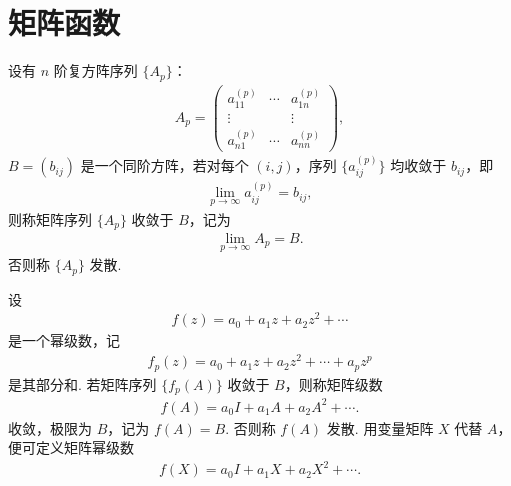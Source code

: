 \documentclass[../../main.tex]{subfiles}%
\begin{document}
\section{矩阵函数}

\begin{definition}[复方阵幂级数]
设有 $n$ 阶复方阵序列 $\{A_p\}$：
\begin{align*}
A_p = \begin{pmatrix}
a_{11}^{(p)} & \cdots & a_{1n}^{(p)} \\
\vdots & & \vdots \\
a_{n1}^{(p)} & \cdots & a_{nn}^{(p)}
\end{pmatrix},
\end{align*}
$B = (b_{ij})$ 是一个同阶方阵，若对每个 $(i,j)$，序列 $\{a_{ij}^{(p)}\}$ 均收敛于 $b_{ij}$，即
\begin{align*}
\lim_{p \to \infty} a_{ij}^{(p)} = b_{ij},
\end{align*}
则称矩阵序列 $\{A_p\}$ 收敛于 $B$，记为
\begin{align*}
\lim_{p \to \infty} A_p = B.
\end{align*}
否则称 $\{A_p\}$ 发散.

设
\begin{align*}
f(z) = a_0 + a_1z + a_2z^2 + \cdots
\end{align*}
是一个幂级数，记
\begin{align*}
f_p(z) = a_0 + a_1z + a_2z^2 + \cdots + a_pz^p
\end{align*}
是其部分和. 若矩阵序列 $\{f_p(A)\}$ 收敛于 $B$，则称矩阵级数
\begin{align*}
f(A) = a_0I + a_1A + a_2A^2 + \cdots .
\end{align*}
收敛，极限为 $B$，记为 $f(A) = B$. 否则称 $f(A)$ 发散. 用变量矩阵 $X$ 代替 $A$，便可定义矩阵幂级数
\begin{align*}
f(X) = a_0I + a_1X + a_2X^2 + \cdots. 
\end{align*} 
\end{definition}
\end{document}
